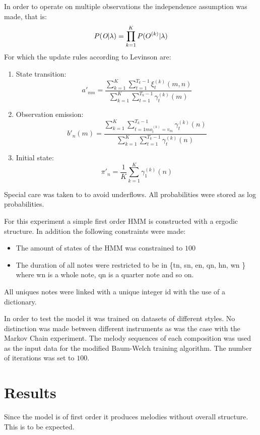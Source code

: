 In order to operate on multiple observations the independence assumption was made, that is:
\[ P(\emph{O} | \lambda) = \prod_{k=1}^K P(O^{(k)} | \lambda) \]
For which the update rules according to Levinson are:
\begin{enumerate}
\item State transition:
\[ a'_{mn} = \frac{\sum^K_{k=1} \sum^{T_k -1 }_{t=1} \xi^{(k)}_t (m,n)}{\sum^K_{k=1} \sum^{T_k-1}_{t=1} \gamma_t^{(k)}(m)} \]

\item Observation emission:
\[ b'_n (m) = \frac{\sum^K_{k=1} \sum^{T_k -1 }_{t=1m o_t^{(k)} = v_m} \gamma^{(k)}_t (n)}{\sum^K_{k=1} \sum^{T_k-1}_{t=1} \gamma_t^{(k)}(n)} \]

\item Initial state:
\[ \pi'_n = \frac{1}{K} \sum^K_{k=1} \gamma_1^{(k)}(n)  \]

\end{enumerate}

Special care was taken to to avoid underflows. All probabilities were stored as log probabilities.


For this experiment a simple first order \ac{HMM} is constructed with a ergodic structure. In addition the following constraints were made:
\begin{itemize}
\item The amount of states of the \ac{HMM} was constrained to $100$
\item The duration of all notes were restricted to be in \{tn, sn, en, qn, hn, wn \} where wn is a whole note, qn is a quarter note and so on. 
\end{itemize}

All uniques notes were linked with a unique integer id with the use of a dictionary. 

In order to test the model it was trained on datasets of different styles. No distinction was made between different instruments as was the case with the Markov Chain experiment.
The melody sequences of each composition was used as the input data for the modified Baum-Welch training algorithm. The number of iterations was set to $100$.


\section{Results}
Since the model is of first order it produces melodies without overall structure. This is to be expected.

